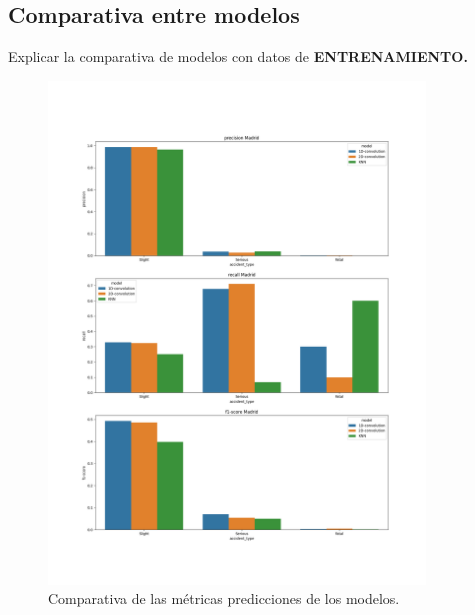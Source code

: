   \subsection{Comparativa entre modelos}

    Explicar la comparativa de modelos con datos de \textbf{ENTRENAMIENTO.}


    \begin{figure}[h]
        \centering
        \includegraphics[width=10cm]{archivos/Resultados/Comparativa}
        \caption{Comparativa de las métricas predicciones de los modelos.}
        \label{ResultsImage}
     \end{figure}

